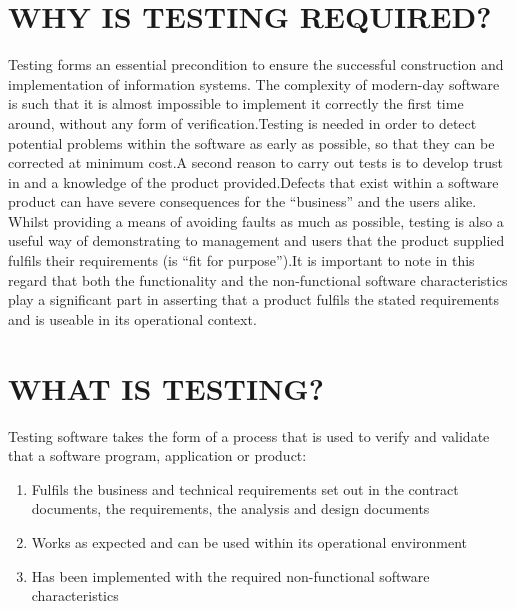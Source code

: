 \documentclass[12pt]{article}
\begin{document}
\section{WHY IS TESTING REQUIRED?}
Testing forms an essential precondition to ensure the successful construction and implementation of information systems. The complexity of modern-day software is such that it is almost impossible to implement it correctly the first time around, without any form of verification.\newline\newline Testing is needed in order to detect potential problems within the software as early as possible, so that they can be corrected at minimum cost.\newline\newline  A second reason to carry out tests is to develop trust in and a knowledge of the product provided.\newline\newline Defects that exist within a software product can have severe consequences for the “business” and the users alike.  Whilst providing a means of avoiding faults as much as possible, testing is also a useful way of demonstrating to management and users that the product supplied fulfils their requirements (is “fit for purpose”).\newline\newline It is important to note in this regard that both the functionality and the non-functional software characteristics play a significant part in asserting that a product fulfils the stated requirements and is useable in its operational context. 

\section{WHAT IS TESTING?}
Testing software takes the form of a process that is used to verify and validate that a software program, application or product: 
\begin{enumerate}
	\item Fulfils the business and technical requirements set out in the contract documents, the requirements, the analysis and design documents
	\item Works as expected and can be used within its operational environment  
	\item Has been implemented with the required non-functional software characteristics 	
\end{enumerate}
\end{document}
